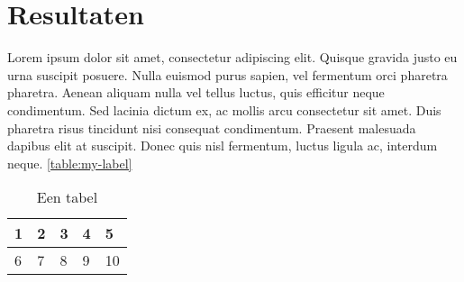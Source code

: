 \section{Resultaten}
Lorem ipsum dolor sit amet, consectetur adipiscing elit. Quisque gravida justo eu urna suscipit posuere. Nulla euismod purus sapien, vel fermentum orci pharetra pharetra. Aenean aliquam nulla vel tellus luctus, quis efficitur neque condimentum. Sed lacinia dictum ex, ac mollis arcu consectetur sit amet. Duis pharetra risus tincidunt nisi consequat condimentum. Praesent malesuada dapibus elit at suscipit. Donec quis nisl fermentum, luctus ligula ac, interdum neque. \ref{table:my-label}


\begin{table}[H]
\centering
    \begin{tabular}{|l|l|l|l|l|}
    \hline
    1 & 2 & 3 & 4 & 5   \\ \hline
    6 & 7 & 8 & 9 & 10  \\ \hline
    \end{tabular}
\caption{Een tabel}
\label{my-label}
\end{table}